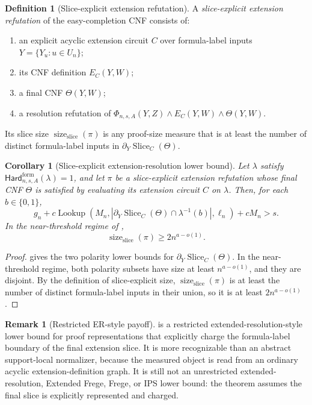 \documentclass[11pt]{article}
\newtheorem{corollary}[theorem]{Corollary}
\theoremstyle{definition}
\newtheorem{definition}[theorem]{Definition}
\newtheorem{remark}[theorem]{Remark}
\newcommand{\bits}{\{0,1\}}
\newcommand{\Lookup}{\operatorname{Lookup}}
\newcommand{\HardF}{\mathsf{Hard}^{\mathrm{form}}}
\begin{document}
\begin{definition}[Slice-explicit extension refutation]\label{def:slice-explicit-er}
A \emph{slice-explicit extension refutation} of the easy-completion CNF consists of:
\begin{enumerate}
  \item an explicit acyclic extension circuit \(C\) over formula-label inputs \(Y=\{Y_u:u\in U_n\}\);
  \item its CNF definition \(E_C(Y,W)\);
  \item a final CNF \(\Theta(Y,W)\);
  \item a resolution refutation of \(\Phi_{n,s,A}(Y,Z)\wedge E_C(Y,W)\wedge\Theta(Y,W)\).
\end{enumerate}
Its slice size \(\operatorname{size}_{\mathrm{slice}}(\pi)\) is any proof-size measure that is at least the number of distinct formula-label inputs in \(\partial_Y\operatorname{Slice}_C(\Theta)\).
\end{definition}

\begin{corollary}[Slice-explicit extension-resolution lower bound]\label{cor:slice-explicit-er}
Let \(\lambda\) satisfy \(\HardF_{n,s,A}(\lambda)=1\), and let \(\pi\) be a slice-explicit extension refutation whose final CNF \(\Theta\) is satisfied by evaluating its extension circuit \(C\) on \(\lambda\).  Then, for each \(b\in\bits\),
\[
  g_n+c\Lookup(M_n,|\partial_Y\operatorname{Slice}_C(\Theta)\cap\lambda^{-1}(b)|,\ell_n)+cM_n>s.
\]
In the near-threshold regime of ,
\[
  \operatorname{size}_{\mathrm{slice}}(\pi)\ge 2n^{a-o(1)}.
\]
\end{corollary}

\begin{proof}
 gives the two polarity lower bounds for \(\partial_Y\operatorname{Slice}_C(\Theta)\).  In the near-threshold regime, both polarity subsets have size at least \(n^{a-o(1)}\), and they are disjoint.  By the definition of slice-explicit size, \(\operatorname{size}_{\mathrm{slice}}(\pi)\) is at least the number of distinct formula-label inputs in their union, so it is at least \(2n^{a-o(1)}\).
\end{proof}

\begin{remark}[Restricted ER-style payoff]\label{rem:slice-explicit-er-scope}
 is a restricted extended-resolution-style lower bound for proof representations that explicitly charge the formula-label boundary of the final extension slice.  It is more recognizable than an abstract support-local normalizer, because the measured object is read from an ordinary acyclic extension-definition graph.  It is still not an unrestricted extended-resolution, Extended Frege, Frege, or IPS lower bound: the theorem assumes the final slice is explicitly represented and charged.
\end{remark}
\end{document}
